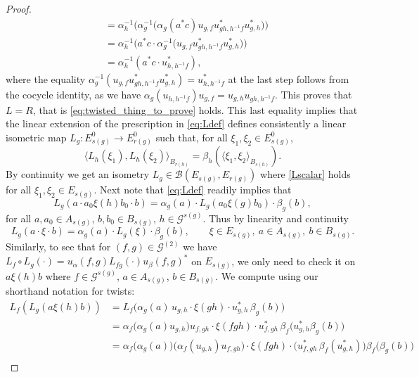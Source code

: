 \documentclass[11 pt, leqno]{amsart}
\numberwithin{equation}{section}
\theoremstyle{plain}
\theoremstyle{definition}
\newcommand{\B}{\mathcal B}
\newcommand{\G}{\mathcal G} %
\begin{document}
\begin{proof}
\[\begin{split}
        &= \alpha_{h}^{-1} \Big( \alpha_{g}^{-1} \big(  \alpha_g(a^* c)u_{g,f} u^{*}_{gh,h^{-1}f} u^{*}_{g,h} \big) \big) \\
        &= \alpha_{h}^{-1} \Big( a^* c\cdot \alpha_{g}^{-1} \big( u_{g,f} u^{*}_{gh,h^{-1}f} u^{*}_{g,h} \big) \Big) \\
        &= \alpha_{h}^{-1}( a^* c\cdot  u^{*}_{h,h^{-1}f} ) , 
\end{split}
\]
where the equality $\alpha_{g}^{-1}(u_{g,f} u^{*}_{gh,h^{-1}f} u^{*}_{g,h}) = u^{*}_{h,h^{-1}f}$ at the last step follows from the cocycle identity, as we have $ \alpha_g (u_{h,h^{-1}f})u_{g,f} = u_{g,h}u_{gh,h^{-1}f}$. 
This proves that $L=R$, that is \eqref{eq:twisted_thing_to_prove} holds.
This last equality implies that the linear extension of the prescription in \eqref{eq:Ldef} defines consistently a linear isometric map $L_g: E_{s(g)}^0 \to E_{r(g)}^0$ such that, for all $\xi_1, \xi_2 \in E_{s(g)}^0$, 
\begin{equation}\label{Lscalar}
    \langle L_h(\xi_1), L_h(\xi_2) \rangle_{B_{r(h)}} = \beta_h( \langle \xi_1, \xi_2 \rangle_{B_{s(h)}}) . 
\end{equation}
By continuity we get an isometry $L_g \in \B(E_{s(g)}, E_{r(g)})$ where \eqref{Lscalar} holds for all $\xi_1, \xi_2 \in E_{s(g)}$. 
Next note that \eqref{eq:Ldef} readily implies that 
\[ 
    L_g (a \cdot a_0 \xi(h)b_0\cdot b) = \alpha_g(a)\cdot  L_g(a_0 \xi(g)b_0) \cdot \beta_g(b), 
\]
for all $a,a_0 \in A_{s(g)}$, $b,b_0 \in B_{s(g)}$, $h\in \G^{s(g)}$. 
Thus by linearity and continuity 
\[ 
    L_g (a\cdot \xi \cdot b) = \alpha_g(a)\cdot L_g(\xi) \cdot \beta_g(b), \qquad  \xi \in E_{s(g)} ,\ a \in A_{s(g)} ,\ b \in  B_{s(g)}. 
\]
Similarly, to see that for $(f,g)\in \G^{(2)}$ we have $L_{f}\circ L_{g}(\cdot) = u_{\alpha}(f,g)L_{fg}(\cdot)u_{\beta}(f,g)^*$ on $E_{s(g)}$, we only need to check it on $a\xi(h)b$ where $f\in \G^{s(g)}$, $a \in A_{s(g)}$, $b \in B_{s(g)}$. 
We compute using our shorthand notation for twists: 
\[
\begin{split} 
    L_{f}( L_{g}(a\xi(h)b)) &= L_f\Big(\alpha_g(a)\,u_{g,h} \cdot\xi(gh)\cdot u_{g,h}^*\,\beta_g(b)\Big) \\
        &= \alpha_f\big(\alpha_g(a) u_{g,h}\big) u_{f,gh}\cdot \xi(fgh) \cdot u_{f,gh}^* \,\beta_f\big(u_{g,h}^* \beta_g(b)\big) \\
        &= \alpha_f\big(\alpha_g(a)\big) \big( \alpha_f (u_{g,h}) u_{f,gh}\big) \cdot \xi(fgh) \cdot \big( u_{f,gh}^* \,\beta_f(u_{g,h}^*)\big) \beta_f\big(\beta_g(b)\big) \\

\end{split}\]
\end{proof}
\end{document}
